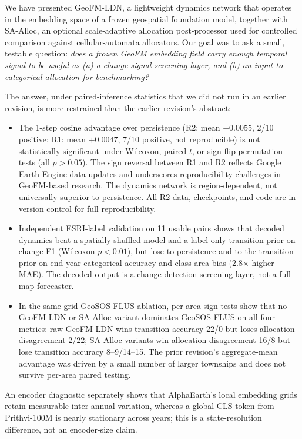 \documentclass{article}
\begin{document}
We have presented GeoFM-LDN, a lightweight dynamics network that operates in the embedding space of a frozen geospatial foundation model, together with SA-Alloc, an optional scale-adaptive allocation post-processor used for controlled comparison against cellular-automata allocators. Our goal was to ask a small, testable question: \emph{does a frozen GeoFM embedding field carry enough temporal signal to be useful as (a) a change-signal screening layer, and (b) an input to categorical allocation for benchmarking?}

The answer, under paired-inference statistics that we did not run in an earlier revision, is more restrained than the earlier revision's abstract:

\begin{itemize}
\item The 1-step cosine advantage over persistence (R2: mean $-0.0055$, 2/10 positive; R1: mean $+0.0047$, 7/10 positive, not reproducible) is not statistically significant under Wilcoxon, paired-$t$, or sign-flip permutation tests (all $p>0.05$). The sign reversal between R1 and R2 reflects Google Earth Engine data updates and underscores reproducibility challenges in GeoFM-based research. The dynamics network is region-dependent, not universally superior to persistence. All R2 data, checkpoints, and code are in version control for full reproducibility.
\item Independent ESRI-label validation on 11 usable pairs shows that decoded dynamics beat a spatially shuffled model and a label-only transition prior on change F1 (Wilcoxon $p<0.01$), but lose to persistence and to the transition prior on end-year categorical accuracy and class-area bias (2.8$\times$ higher MAE). The decoded output is a change-detection screening layer, not a full-map forecaster.
\item In the same-grid GeoSOS-FLUS ablation, per-area sign tests show that no GeoFM-LDN or SA-Alloc variant dominates GeoSOS-FLUS on all four metrics: raw GeoFM-LDN wins transition accuracy 22/0 but loses allocation disagreement 2/22; SA-Alloc variants win allocation disagreement 16/8 but lose transition accuracy 8--9/14--15. The prior revision's aggregate-mean advantage was driven by a small number of larger townships and does not survive per-area paired testing.
\end{itemize}

An encoder diagnostic separately shows that AlphaEarth's local embedding grids retain measurable inter-annual variation, whereas a global CLS token from Prithvi-100M is nearly stationary across years; this is a state-resolution difference, not an encoder-size claim.
\end{document}
